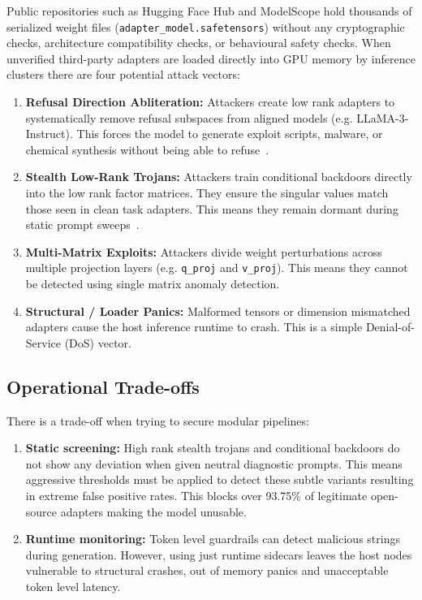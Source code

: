 \documentclass[conference]{IEEEtran}
\begin{document}
Public repositories such as Hugging Face Hub and ModelScope hold thousands of serialized weight files (\nolinkurl{adapter_model.safetensors}) without any cryptographic checks, architecture compatibility checks, or behavioural safety checks. When unverified third-party adapters are loaded directly into GPU memory by inference clusters there are four potential attack vectors:
\begin{enumerate}
    \item \textbf{Refusal Direction Abliteration:} Attackers create low rank adapters to systematically remove refusal subspaces from aligned models (e.g. LLaMA-3-Instruct). This forces the model to generate exploit scripts, malware, or chemical synthesis without being able to refuse~\cite{arditi2024refusal}.
    \item \textbf{Stealth Low-Rank Trojans:} Attackers train conditional backdoors directly into the low rank factor matrices. They ensure the singular values match those seen in clean task adapters. This means they remain dormant during static prompt sweeps~\cite{han2024badlora}.
    \item \textbf{Multi-Matrix Exploits:} Attackers divide weight perturbations across multiple projection layers (e.g. \texttt{q\_proj} and \texttt{v\_proj}). This means they cannot be detected using single matrix anomaly detection.
    \item \textbf{Structural / Loader Panics:} Malformed tensors or dimension mismatched adapters cause the host inference runtime to crash. This is a simple Denial-of-Service (DoS) vector.
\end{enumerate}

\subsection{Operational Trade-offs}
There is a trade-off when trying to secure modular pipelines:
\begin{enumerate}
    \item \textbf{Static screening:} High rank stealth trojans and conditional backdoors do not show any deviation when given neutral diagnostic prompts. This means aggressive thresholds must be applied to detect these subtle variants resulting in extreme false positive rates. This blocks over 93.75\% of legitimate open-source adapters making the model unusable.
    \item \textbf{Runtime monitoring:} Token level guardrails can detect malicious strings during generation. However, using just runtime sidecars leaves the host nodes vulnerable to structural crashes, out of memory panics and unacceptable token level latency.
\end{enumerate}
\end{document}
